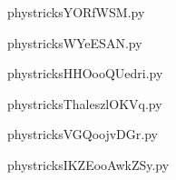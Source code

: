     \clearpage
    


    \newcommand{\CaptionFigYORfWSM}{<+Type your caption here+>}
    \begin{center}
        
    \end{center}
    phystricksYORfWSM.py

    

    \clearpage
    


    \newcommand{\CaptionFigWYeESAN}{<+Type your caption here+>}
    \begin{center}
        
    \end{center}
    phystricksWYeESAN.py

    

    \clearpage
    


    \newcommand{\CaptionFigHHOooQUedri}{<+Type your caption here+>}
    \begin{center}
        
    \end{center}
    phystricksHHOooQUedri.py

    

    \clearpage
    


    \newcommand{\CaptionFigThaleszlOKVq}{<+Type your caption here+>}
    \begin{center}
        
    \end{center}
    phystricksThaleszlOKVq.py

    

    \clearpage
    


    \newcommand{\CaptionFigVGQoojvDGr}{<+Type your caption here+>}
    \begin{center}
        
    \end{center}
    phystricksVGQoojvDGr.py

    

    \clearpage
    


    \newcommand{\CaptionFigIKZEooAwkZSy}{<+Type your caption here+>}
    \begin{center}
        
    \end{center}
    phystricksIKZEooAwkZSy.py

